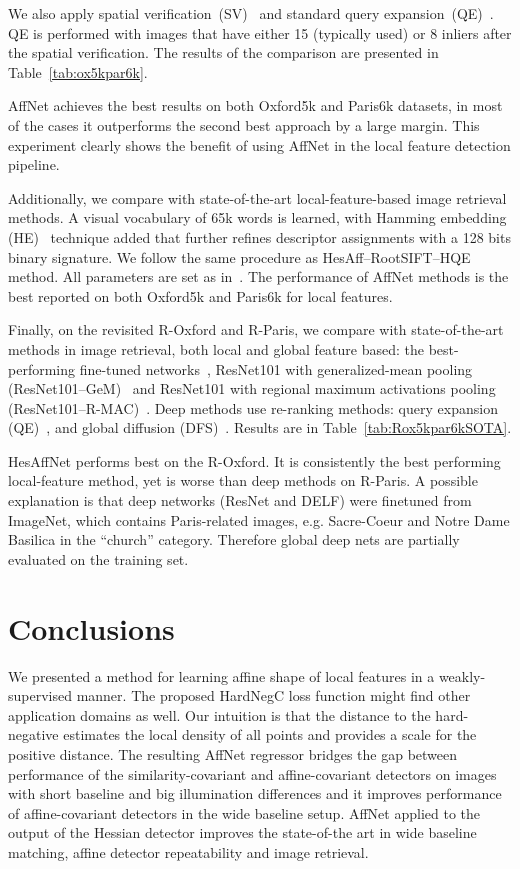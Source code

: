 \documentclass[runningheads]{llncs}
\begin{document}
We also apply spatial verification~(SV)~\cite{Philbin07} and standard query expansion~(QE)~\cite{Philbin08}. QE is performed with images that have either 15 (typically used) or 8 inliers after the spatial verification. The results of the comparison are presented in Table~\ref{tab:ox5kpar6k}.

AffNet achieves the best results on both Oxford5k and Paris6k datasets, in most of the cases it outperforms the second best approach by a large margin. This experiment clearly shows the benefit of using AffNet in the local feature detection pipeline.


Additionally, we compare with state-of-the-art local-feature-based image retrieval methods.
A visual vocabulary of 65k words is learned, with Hamming embedding (HE)~\cite{Jegou-IJCV2010HE} technique added that further refines descriptor assignments with a 128 bits binary signature. We follow the same procedure as HesAff--RootSIFT--HQE~\cite{Tolias-PR2014HQE} method.
All parameters are set as in~\cite{Tolias-PR2014HQE}. 
The performance of AffNet methods is the best reported on both Oxford5k and Paris6k for local features. 


Finally, on the revisited R-Oxford and R-Paris, we compare with state-of-the-art methods in image retrieval, both local and global feature based: the best-performing fine-tuned networks~\cite{He2016ResNet}, ResNet101 with generalized-mean pooling (ResNet101--GeM)~\cite{Radenovic-arXiv17} and ResNet101 with regional maximum activations pooling (ResNet101--R-MAC)~\cite{Gordo-IJCV17}. Deep methods use re-ranking methods:  query expansion (QE)~\cite{Radenovic-arXiv17}, and global diffusion (DFS)~\cite{Iscen2017CVPR}. Results are in Table~\ref{tab:Rox5kpar6kSOTA}. 

HesAffNet performs best on the R-Oxford. It is consistently the best performing local-feature method, yet is worse than deep methods on R-Paris. A  possible explanation is that deep networks (ResNet and DELF) were finetuned from ImageNet, which contains Paris-related images, e.g. Sacre-Coeur and Notre Dame Basilica in the ``church'' category. Therefore global deep nets are partially evaluated on the training set. 

\section{Conclusions}
\label{sec:conclusions}
We presented a method for learning affine shape of local features in a weakly-supervised manner. The proposed HardNegC loss function might find other application domains as well. Our intuition is that the distance to the hard-negative estimates the local density of all points and provides a scale for the positive distance. The resulting AffNet regressor bridges the gap between performance of the similarity-covariant and affine-covariant detectors on images with short baseline and big illumination differences and it improves performance of affine-covariant detectors in the wide baseline setup. AffNet applied to the output of the Hessian detector improves the state-of-the art in wide baseline matching, affine detector repeatability and image retrieval.
\end{document}
